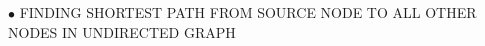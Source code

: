 \documentclass[preview]{standalone}
\begin{document}
\begin{center}
$\bullet$ FINDING SHORTEST PATH FROM SOURCE NODE TO ALL OTHER NODES IN UNDIRECTED GRAPH
\end{center}
\end{document}
